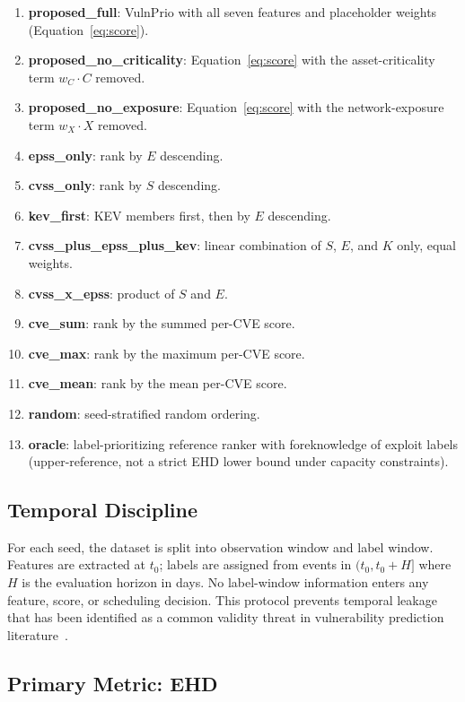 \documentclass[journal]{IEEEtran}
\begin{document}
\begin{enumerate}[leftmargin=*]
  \item \textbf{proposed\_full}: VulnPrio with all seven features
    and placeholder weights (Equation~\ref{eq:score}).
  \item \textbf{proposed\_no\_criticality}: Equation~\ref{eq:score}
    with the asset-criticality term $w_C \cdot C$ removed.
  \item \textbf{proposed\_no\_exposure}: Equation~\ref{eq:score}
    with the network-exposure term $w_X \cdot X$ removed.
  \item \textbf{epss\_only}: rank by $E$ descending.
  \item \textbf{cvss\_only}: rank by $S$ descending.
  \item \textbf{kev\_first}: KEV members first, then by $E$
    descending.
  \item \textbf{cvss\_plus\_epss\_plus\_kev}: linear combination of
    $S$, $E$, and $K$ only, equal weights.
  \item \textbf{cvss\_x\_epss}: product of $S$ and $E$.
  \item \textbf{cve\_sum}: rank by the summed per-CVE score.
  \item \textbf{cve\_max}: rank by the maximum per-CVE score.
  \item \textbf{cve\_mean}: rank by the mean per-CVE score.
  \item \textbf{random}: seed-stratified random ordering.
  \item \textbf{oracle}: label-prioritizing reference ranker with
    foreknowledge of exploit labels (upper-reference, not a
    strict EHD lower bound under capacity constraints).
\end{enumerate}

\subsection{Temporal Discipline}

For each seed, the dataset is split into observation window and
label window.  Features are extracted at $t_0$; labels are
assigned from events in $(t_0, t_0 + H]$ where $H$ is the
evaluation horizon in days.  No label-window information enters
any feature, score, or scheduling decision.  This protocol
prevents temporal leakage that has been identified as a common
validity threat in vulnerability prediction
literature~\cite{jacobs2021epss}.

\subsection{Primary Metric: EHD}
\end{document}
